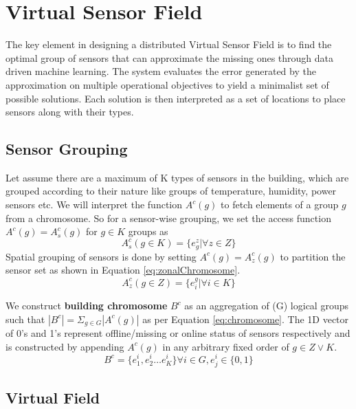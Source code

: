 \section{Virtual Sensor Field}
\label{chap:formulation}
The key element in designing a distributed Virtual Sensor Field is to find the optimal group of sensors that can approximate the missing ones through data driven machine learning.
The system evaluates the error generated by the approximation on multiple operational objectives to yield a minimalist set of possible solutions.
Each solution is then interpreted as a set of locations to place sensors along with their types. 

\subsection{Sensor Grouping}

Let assume there are a maximum of K types of sensors in the building, which are grouped according to their nature like groups of temperature, humidity, power sensors etc.
We will interpret the function $A^c(g)$ to fetch elements of a group $g$ from a chromosome. 
So for a sensor-wise grouping, we set the access function $A^c(g) =A_s^c(g)$ for $g \in K$ groups as 
\begin{equation}
    A_s^c(g \in K) = \{e_g^z | \forall z \in Z\}
\end{equation}
Spatial grouping of sensors is done by setting $A^c(g) =A_z^c(g)$ to partition the sensor set as shown in Equation \ref{eq:zonalChromosome}. 
\begin{equation}
    A_z^c(g \in Z) = \{e_i^g | \forall i \in K\}
    \label{eq:zonalChromosome}
\end{equation}


We construct \textbf{building chromosome} $B^c$ as an aggregation of (G) logical groups such that $|B^c| = \Sigma_{g \in G}|A^c(g)|$ as per Equation \ref{eq:chromosome}. 
The 1D vector of 0's and 1's represent offline/missing or online status of sensors respectively and is constructed by appending $A^c(g)$ in any arbitrary fixed order of $g \in Z \lor K$.
\begin{equation}
B^c = \{e^i_1, e^i_2 \dots e^i_K\} \forall i \in G, e^i_j \in \{0,1\}
\label{eq:chromosome}
\end{equation}


\subsection{Virtual Field }


